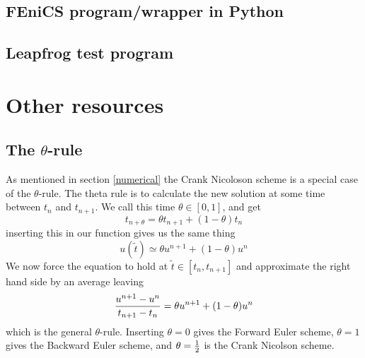 \documentclass[a4paper,english, 10pt, twoside]{article}
\begin{document}
\subsection{FEniCS program/wrapper in Python}

\subsection{Leapfrog test program}


\section{Other resources}
\subsection{The $\theta$-rule}
As mentioned in section \ref{numerical} the Crank Nicoloson scheme is a special case of the $\theta$-rule. The theta rule is to calculate the new 
solution at some time between $t_n$ and $t_{n+1}$. We call this time $\theta\in[0,1]$, and get
$$
t_{n+\theta} = \theta t_{n+1} + (1-\theta)t_n
$$
inserting this in our function gives us the same thing
\begin{equation*}
 u(\tilde{t}) \simeq \theta u^{n+1} + (1-\theta)u^n
\end{equation*}
We now force the equation to hold at $\tilde{t}\in[t_{n},t_{n+1}]$ and approximate the right hand side by an average leaving
\begin{equation*}
 {u^{n+1}- u^{n}\over t_{n+1} -t_{n}} = \theta u^{n+1} + (1-\theta)u^n
\end{equation*}
which is the general $\theta$-rule. Inserting $\theta = 0$ gives the Forward Euler scheme, $\theta = 1$ gives the Backward Euler scheme, and 
$\theta = {1\over2}$ is the Crank Nicolson scheme.
\end{document}
